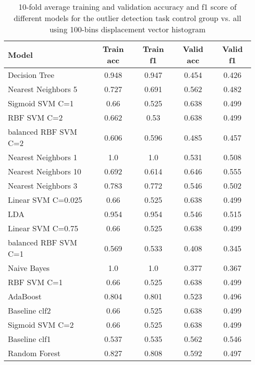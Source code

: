 \documentclass[letterpaper, 10pt, conference]{ieeeconf}  %
\begin{document}
\begin{center}
\begin{table}[h!]
\begin{tabular}{lcccc}
	Model & Train acc & Train f1 & Valid acc & Valid f1 \\ \hline 
    Decision Tree & 0.948 & 0.947 & 0.454 & 0.426\\
    Nearest Neighbors 5 & 0.727 & 0.691 & 0.562 & 0.482\\
    Sigmoid SVM C=1 & 0.66 & 0.525 & 0.638 & 0.499\\
    RBF SVM C=2 & 0.662 & 0.53 & 0.638 & 0.499\\
    balanced RBF SVM C=2 & 0.606 & 0.596 & 0.485 & 0.457\\
    Nearest Neighbors 1 & 1.0 & 1.0 & 0.531 & 0.508\\
    Nearest Neighbors 10 & 0.692 & 0.614 & 0.646 & 0.555\\
    Nearest Neighbors 3 & 0.783 & 0.772 & 0.546 & 0.502\\
    Linear SVM C=0.025 & 0.66 & 0.525 & 0.638 & 0.499\\
    LDA & 0.954 & 0.954 & 0.546 & 0.515\\
    Linear SVM C=0.75 & 0.66 & 0.525 & 0.638 & 0.499\\
    balanced RBF SVM C=1 & 0.569 & 0.533 & 0.408 & 0.345\\
    Naive Bayes & 1.0 & 1.0 & 0.377 & 0.367\\
    RBF SVM C=1 & 0.66 & 0.525 & 0.638 & 0.499\\
    AdaBoost & 0.804 & 0.801 & 0.523 & 0.496\\
    Baseline clf2 & 0.66 & 0.525 & 0.638 & 0.499\\
    Sigmoid SVM C=2 & 0.66 & 0.525 & 0.638 & 0.499\\
    Baseline clf1 & 0.537 & 0.535 & 0.562 & 0.546\\
    Random Forest & 0.827 & 0.808 & 0.592 & 0.497\\
\end{tabular}
\caption{\label{outlier-classic-result1} 10-fold average training and validation accuracy and f1 score of different models for the outlier detection task control group vs. all using 100-bins displacement vector histogram}
\end{table}
\end{center}
\end{document}
